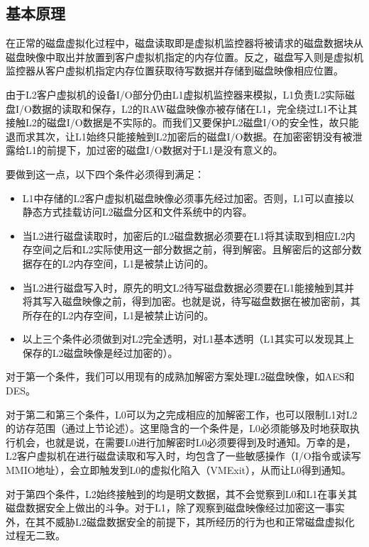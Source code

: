 \subsection{基本原理}

在正常的磁盘虚拟化过程中，磁盘读取即是虚拟机监控器将被请求的磁盘数据块从磁盘映像中取出并放置到客户虚拟机指定的内存位置。反之，磁盘写入则是虚拟机监控器从客户虚拟机指定内存位置获取待写数据并存储到磁盘映像相应位置。

由于L2客户虚拟机的设备I/O部分仍由L1虚拟机监控器来模拟，L1负责L2实际磁盘I/O数据的读取和保存，L2的RAW磁盘映像亦被存储在L1，完全绕过L1不让其接触L2的磁盘I/O数据是不实际的。而我们又要保护L2磁盘I/O的安全性，故只能退而求其次，让L1始终只能接触到L2加密后的磁盘I/O数据。在加密密钥没有被泄露给L1的前提下，加过密的磁盘I/O数据对于L1是没有意义的。

要做到这一点，以下四个条件必须得到满足：

\begin{itemize}
\item{L1中存储的L2客户虚拟机磁盘映像必须事先经过加密。否则，L1可以直接以静态方式挂载访问L2磁盘分区和文件系统中的内容。}
\item{当L2进行磁盘读取时，加密后的L2磁盘数据必须要在L1将其读取到相应L2内存空间之后和L2实际使用这一部分数据之前，得到解密。且解密后的这部分数据存在的L2内存空间，L1是被禁止访问的。}
\item{当L2进行磁盘写入时，原先的明文L2待写磁盘数据必须要在L1能接触到其并将其写入磁盘映像之前，得到加密。也就是说，待写磁盘数据在被加密前，其所存在的L2内存空间，L1是被禁止访问的。}
\item{以上三个条件必须做到对L2完全透明，对L1基本透明（L1其实可以发现其上保存的L2磁盘映像是经过加密的）。}
\end{itemize}

对于第一个条件，我们可以用现有的成熟加解密方案处理L2磁盘映像，如AES和DES。

对于第二和第三个条件，L0可以为之完成相应的加解密工作，也可以限制L1对L2的访存范围（通过上节论述）。这里隐含的一个条件是，L0必须能够及时地获取执行机会，也就是说，在需要L0进行加解密时L0必须要得到及时通知。万幸的是，L2客户虚拟机在进行磁盘读取和写入时，均包含了一些敏感操作（I/O指令或读写MMIO地址），会立即触发到L0的虚拟化陷入（VMExit），从而让L0得到通知。

对于第四个条件，L2始终接触到的均是明文数据，其不会觉察到L0和L1在事关其磁盘数据安全上做出的斗争。对于L1，除了观察到磁盘映像经过加密这一事实外，在其不威胁L2磁盘数据安全的前提下，其所经历的行为也和正常磁盘虚拟化过程无二致。



